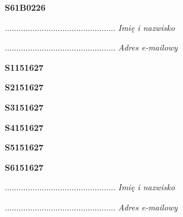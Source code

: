 \begin{turn}{90}\huge \textbf{S61B0226}\end{turn}

\begin{turn}{90}\begin{minipage}{\linewidth} \vspace{20mm} ................................................  \textit{Imię i nazwisko}\end{minipage}\end{turn}

\begin{turn}{90}\begin{minipage}{\linewidth} \vspace{20mm} ................................................  \textit{Adres e-mailowy}\end{minipage}\end{turn}

\begin{turn}{90}\huge \textbf{S1151627}\end{turn}

\begin{turn}{90}\huge \textbf{S2151627}\end{turn}

\begin{turn}{90}\huge \textbf{S3151627}\end{turn}

\begin{turn}{90}\huge \textbf{S4151627}\end{turn}

\begin{turn}{90}\huge \textbf{S5151627}\end{turn}

\begin{turn}{90}\huge \textbf{S6151627}\end{turn}

\begin{turn}{90}\begin{minipage}{\linewidth} \vspace{20mm} ................................................  \textit{Imię i nazwisko}\end{minipage}\end{turn}

\begin{turn}{90}\begin{minipage}{\linewidth} \vspace{20mm} ................................................  \textit{Adres e-mailowy}\end{minipage}\end{turn}


